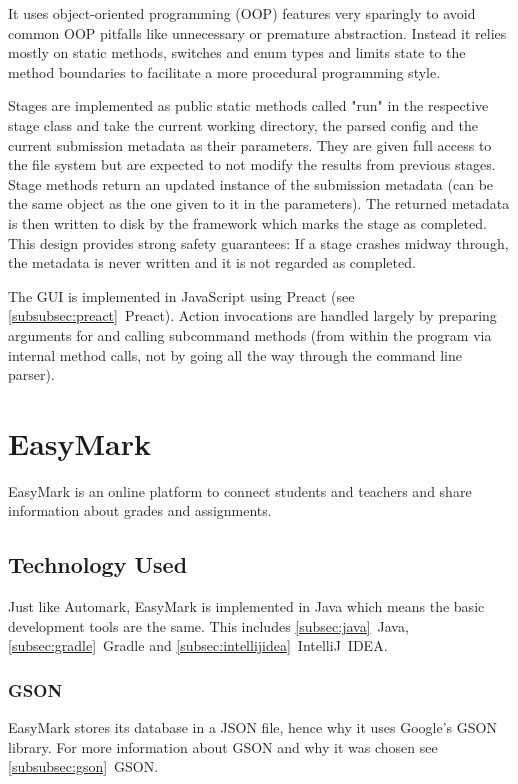 \documentclass[12pt,a4paper,oneside]{report}
\begin{document}
	It uses object-oriented programming (OOP) features very sparingly to avoid common OOP pitfalls like unnecessary or premature abstraction. Instead it relies mostly on static methods, switches and enum types and limits state to the method boundaries to facilitate a more procedural programming style.

	Stages are implemented as public static methods called "run" in the respective stage class and take the current working directory, the parsed config and the current submission metadata as their parameters. They are given full access to the file system but are expected to not modify the results from previous stages. Stage methods return an updated instance of the submission metadata (can be the same object as the one given to it in the parameters). The returned metadata is then written to disk by the framework which marks the stage as completed. This design provides strong safety guarantees: If a stage crashes midway through, the metadata is never written and it is not regarded as completed.

	The GUI is implemented in JavaScript using Preact (see \ref{subsubsec:preact}~Preact). Action invocations are handled largely by preparing arguments for and calling subcommand methods (from within the program via internal method calls, not by going all the way through the command line parser).

	\chapter{EasyMark}
	EasyMark is an online platform to connect students and teachers and share information about grades and assignments.

	\section{Technology Used}
	Just like Automark, EasyMark is implemented in Java which means the basic development tools are the same. This includes \ref{subsec:java}~Java, \ref{subsec:gradle}~Gradle and \ref{subsec:intellijidea}~IntelliJ~IDEA.

	\subsection{GSON}
	EasyMark stores its database in a JSON file, hence why it uses Google's GSON library. For more information about GSON and why it was chosen see \ref{subsubsec:gson}~GSON.
\end{document}
